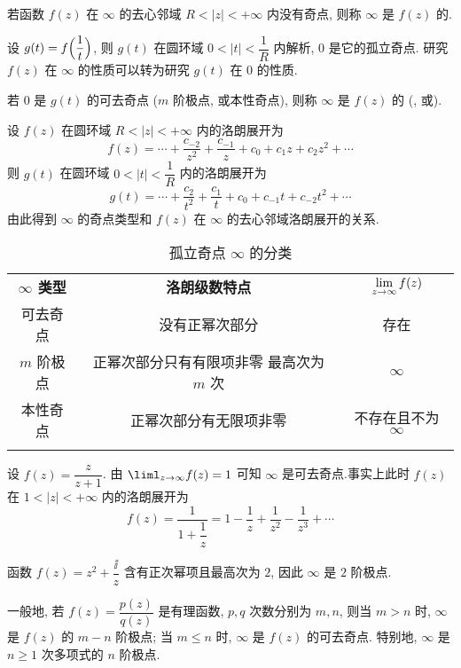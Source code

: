 \begin{definition}
  若函数 $f(z)$ 在 $\infty$ 的去心邻域 $R<|z|<+\infty$ 内没有奇点, 则称 $\infty$ 是 $f(z)$ 的.
\end{definition}

设 $g(t)=f\Bigl(\dfrac1t\Bigr)$, 则 $g(t)$ 在圆环域 $0<|t|<\dfrac1R$ 内解析, $0$ 是它的孤立奇点.
研究 $f(z)$ 在 $\infty$ 的性质可以转为研究 $g(t)$ 在 $0$ 的性质.

\begin{definition}
  若 $0$ 是 $g(t)$ 的可去奇点 ($m$ 阶极点, 或本性奇点), 则称 $\infty$ 是 $f(z)$ 的 (, 或).
\end{definition}

设 $f(z)$ 在圆环域 $R<|z|<+\infty$ 内的洛朗展开为
\[
  f(z)=\cdots+\frac{c_{-2}}{z^2}+\frac{c_{-1}}{z}+c_0+c_1z+c_2z^2+\cdots
\]
则 $g(t)$ 在圆环域 $0<|t|<\dfrac1R$ 内的洛朗展开为
\[
  g(t)=\cdots+\frac{c_2}{t^2}+\frac{c_1}t+c_0+c_{-1}t+c_{-2}t^2+\cdots
\]
由此得到 $\infty$ 的奇点类型和 $f(z)$ 在 $\infty$ 的去心邻域洛朗展开的关系.

\begin{table}[!htb]
  \centering
  \begin{tabular}{ccc}
    \topcolorrule
      \bf $\infty$ 类型&
      \bf 洛朗级数特点&
      $\lim\limits_{z\rightarrow\infty}f(z)$\\ 
    \topcolorrule
      可去奇点&
      没有正幂次部分&
      存在\\
    \midcolorrule
      $m$ 阶极点&
      \makecell{正幂次部分只有有限项非零\\最高次为 $m$ 次}&
      $\infty$\\
    \midcolorrule
      本性奇点&
      正幂次部分有无限项非零&
      不存在且不为 $\infty$\\ 
    \bottomcolorrule
  \end{tabular}
  \caption{孤立奇点 $\infty$ 的分类}
\end{table}

\begin{exampleenum}
  \item 设 $f(z)=\dfrac z{z+1}$. \smallskip
  由 $\liml_{z\ra\infty}f(z)=1$ 可知 $\infty$ 是可去奇点.事实上此时 $f(z)$ 在 $1<|z|<+\infty$ 内的洛朗展开为
  \[
      f(z)=\frac{1}{1+\dfrac1z}
    =1-\frac1z+\frac1{z^2}-\frac1{z^3}+\cdots
  \]
  \item 函数 $f(z)=z^2+\dfrac\ii z$ 含有正次幂项且最高次为 $2$, 因此 $\infty$ 是 $2$ 阶极点.
  \smallskip

  一般地, 若 $f(z)=\dfrac{p(z)}{q(z)}$ 是有理函数, $p,q$ 次数分别为 $m,n$, 则当 $m>n$ 时, $\infty$ 是 $f(z)$ 的 $m-n$ 阶极点;
  当 $m\le n$ 时, $\infty$ 是 $f(z)$ 的可去奇点.
  特别地, $\infty$ 是 $n\ge1$ 次多项式的 $n$ 阶极点.
\end{exampleenum}

